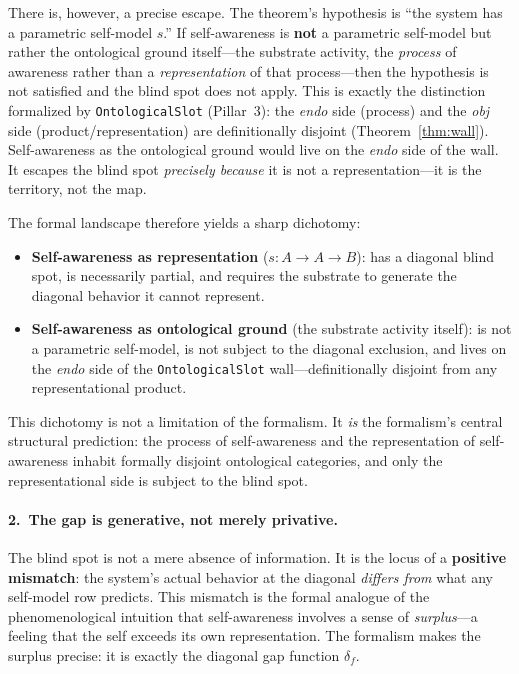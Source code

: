 \documentclass[11pt]{article}
\begin{document}
There is, however, a precise escape.  The theorem's hypothesis is
``the system has a parametric self-model $s$.''  If self-awareness
is \textbf{not} a parametric self-model but rather the ontological
ground itself---the substrate activity, the \emph{process} of
awareness rather than a \emph{representation} of that process---then
the hypothesis is not satisfied and the blind spot does not apply.
This is exactly the distinction formalized by \texttt{OntologicalSlot}
(Pillar~3): the \emph{endo} side (process) and the \emph{obj} side
(product/representation) are definitionally disjoint
(Theorem~\ref{thm:wall}).  Self-awareness as the ontological ground
would live on the \emph{endo} side of the wall.  It escapes the
blind spot \emph{precisely because} it is not a representation---it
is the territory, not the map.

The formal landscape therefore yields a sharp dichotomy:
\begin{itemize}[leftmargin=1.5em,itemsep=0.15ex,topsep=0.3ex,parsep=0pt]
\item \textbf{Self-awareness as representation} ($s : A \to A \to B$):
  has a diagonal blind spot, is necessarily partial, and requires the
  substrate to generate the diagonal behavior it cannot represent.
\item \textbf{Self-awareness as ontological ground} (the substrate
  activity itself): is not a parametric self-model, is not subject to
  the diagonal exclusion, and lives on the \emph{endo} side of the
  \texttt{OntologicalSlot} wall---definitionally disjoint from any
  representational product.
\end{itemize}
This dichotomy is not a limitation of the formalism.  It \emph{is}
the formalism's central structural prediction: the process of
self-awareness and the representation of self-awareness inhabit
formally disjoint ontological categories, and only the
representational side is subject to the blind spot.

\paragraph{2.\ The gap is generative, not merely privative.}
The blind spot is not a mere absence of information.  It is the
locus of a \textbf{positive mismatch}: the system's actual
behavior at the diagonal \emph{differs from} what any self-model
row predicts.  This mismatch is the formal analogue of the
phenomenological intuition that self-awareness involves a sense of
\emph{surplus}---a feeling that the self exceeds its own
representation.  The formalism makes the surplus precise: it is
exactly the diagonal gap function $\delta_f$.
\end{document}

